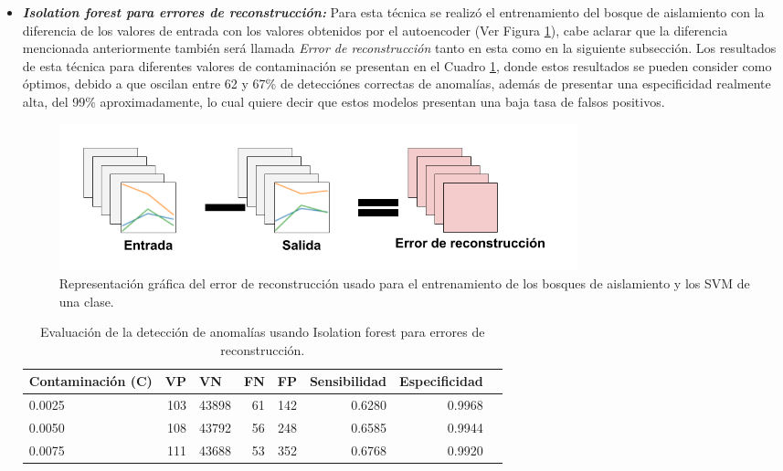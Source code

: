 \begin{itemize}
\item \textbf{\textit{Isolation forest para errores de reconstrucci\'{o}n: }}Para esta t\'{e}cnica se realiz\'{o} el entrenamiento del bosque de aislamiento con la diferencia de los valores de entrada con los valores obtenidos por el autoencoder (Ver Figura \ref{fig:error}), cabe aclarar que la diferencia mencionada anteriormente tambi\'{e}n ser\'{a} llamada \textit{Error de reconstrucci\'{o}n} tanto en esta como en la siguiente subsecci\'{o}n. Los resultados de esta t\'{e}cnica para diferentes valores de contaminaci\'{o}n se presentan en el Cuadro \ref{table:evaluacion_IF_errores_reconstruccion}, donde estos resultados se pueden consider como \'{o}ptimos, debido a que oscilan entre 62 y 67\% de detecci\'{o}nes correctas de anomal\'{i}as, adem\'{a}s de presentar una especificidad realmente alta, del 99\% aproximadamente, lo cual quiere decir que estos modelos presentan una baja tasa de falsos positivos. 

\begin{figure}[H]
        \centering
            \includegraphics[width=0.75\textwidth, frame]{imagenes/Cap5/error}
        \caption{Representaci\'{o}n gr\'{a}fica del error de reconstrucci\'{o}n usado para el entrenamiento de los bosques de aislamiento y los SVM de una clase.}
		\label{fig:error}
\end{figure}

\begin{table}[H]
\centering
\begin{center}
\begin{tabular}{|l|r|r|r|r|r|r|r|}
\hline
\textbf{Contaminaci\'{o}n (C)} & \multicolumn{1}{l|}{\textbf{VP}} & \multicolumn{1}{l|}{\textbf{VN}}& \multicolumn{1}{l|}{\textbf{FN}}& \multicolumn{1}{l|}{\textbf{FP}} & \multicolumn{1}{l|}{\textbf{Sensibilidad}} & \multicolumn{1}{l|}{\textbf{Especificidad}} \\ \hline
0.0025 & \cellcolor[HTML]{AADD99} 103 & \cellcolor[HTML]{AADD99} 43898 & \cellcolor[HTML]{FFCE93} 61 & \cellcolor[HTML]{FFCE93} 142 & 0.6280 & 0.9968 \\ \hline
0.0050 & \cellcolor[HTML]{AADD99} 108 & \cellcolor[HTML]{AADD99} 43792 & \cellcolor[HTML]{FFCE93} 56 & \cellcolor[HTML]{FFCE93} 248 & 0.6585 & 0.9944 \\ \hline
0.0075 & \cellcolor[HTML]{AADD99} 111 & \cellcolor[HTML]{AADD99} 43688 & \cellcolor[HTML]{FFCE93} 53 & \cellcolor[HTML]{FFCE93} 352 & 0.6768 & 0.9920 \\ \hline
\end{tabular}
\end{center}
\caption{Evaluaci\'{o}n de la detecci\'{o}n de anomal\'{i}as usando Isolation forest para errores de reconstrucci\'{o}n.}
\label{table:evaluacion_IF_errores_reconstruccion}
\end{table}
\end{itemize}

